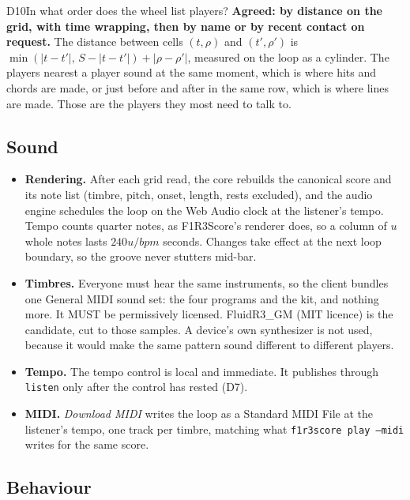 \documentclass[11pt,a4paper]{article}
\newcommand{\code}[1]{\texttt{#1}}
\newcommand{\MUST}{\textsc{must}}
\newcounter{req}
\renewcommand{\MUST}{{\fontsize{0.82em}{1em}\selectfont MUST}}
\begin{document}
\begin{decision}{D10}{In what order does the wheel list players?}
\textbf{Agreed: by distance on the grid, with time wrapping, then by name or by recent
contact on request.} The distance between cells $(t,\rho)$ and $(t',\rho')$ is
$\min(|t-t'|,\,S-|t-t'|)+|\rho-\rho'|$, measured on the loop as a cylinder. The players
nearest a player sound at the same moment, which is where hits and chords are made, or just
before and after in the same row, which is where lines are made. Those are the players they
most need to talk to.
\end{decision}

\subsection{Sound}

\begin{itemize}[leftmargin=1.2em,itemsep=2pt]
\item \textbf{Rendering.} After each grid read, the core rebuilds the canonical score and its
  note list (timbre, pitch, onset, length, rests excluded), and the audio engine schedules the
  loop on the Web Audio clock at the listener's tempo. Tempo counts quarter notes, as F1R3Score's renderer
  does, so a column of $u$ whole notes lasts $240u/\mathit{bpm}$ seconds.
  Changes take effect at the next loop boundary, so the groove never stutters mid-bar.
\item \textbf{Timbres.} Everyone must hear the same instruments, so the client bundles one
  General MIDI sound set: the four programs and the kit, and nothing more. It \MUST{} be
  permissively licensed. FluidR3\_GM (MIT licence) is the candidate, cut to those samples.
  A device's own synthesizer is not used, because it would make the same pattern sound
  different to different players.
\item \textbf{Tempo.} The tempo control is local and immediate. It publishes through
  \code{listen} only after the control has rested (D7).
\item \textbf{MIDI.} \emph{Download MIDI} writes the loop as a Standard MIDI File at the
  listener's tempo, one track per timbre, matching what \code{f1r3score play --midi} writes for
  the same score.
\end{itemize}

\subsection{Behaviour}
\end{document}
